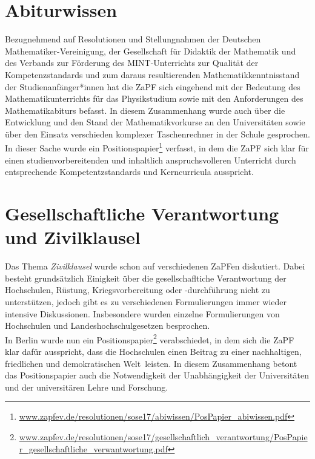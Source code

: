 \documentclass[a4paper]{article}
\begin{document}
\section*{Abiturwissen}
Bezugnehmend auf Resolutionen und Stellungnahmen der Deutschen
Mathematiker-Vereinigung, der Gesellschaft für Didaktik der Mathematik und des
Verbands zur Förderung des MINT-Unterrichts zur Qualität der Kompetenzstandards
und zum daraus resultierenden Mathematikkenntnisstand der Studienanfänger*innen
hat die ZaPF sich eingehend mit der Bedeutung des Mathematikunterrichts für das
Physikstudium sowie mit den Anforderungen des Mathematikabiturs befasst. In
diesem Zusammenhang wurde auch über die Entwicklung und den Stand der
Mathematikvorkurse an den Universitäten sowie über den Einsatz verschieden
komplexer Taschenrechner in der Schule gesprochen. In dieser Sache wurde ein
Positionspapier\footnote{\href{https://zapfev.de/resolutionen/sose17/abiwissen/PosPapier_abiwissen.pdf}{\url{www.zapfev.de/resolutionen/sose17/abiwissen/PosPapier_abiwissen.pdf}}}
verfasst, in dem die ZaPF sich klar für einen studienvorbereitenden und
inhaltlich anspruchsvolleren Unterricht durch entsprechende Kompetentzstandards
und Kerncurricula ausspricht.

\section*{Gesellschaftliche Verantwortung und Zivilklausel} 
Das Thema \emph{Zivilklausel} wurde schon auf verschiedenen ZaPFen diskutiert.
Dabei besteht grundsätzlich Einigkeit über die gesellschafltiche Verantwortung
der Hochschulen, Rüstung, Kriegsvorbereitung oder -durchführung nicht zu
unterstützen, jedoch gibt es zu verschiedenen Formulierungen immer wieder
intensive Diskussionen. Insbesondere wurden einzelne Formulierungen von
Hochschulen und Landeshochschulgesetzen besprochen.\\ In Berlin wurde nun ein
Positionspapier\footnote{\href{https://zapfev.de/resolutionen/sose17/gesellschaftlich_verantwortung/PosPapier_gesellschaftliche_verwantwortung.pdf}
{\url{www.zapfev.de/resolutionen/sose17/gesellschaftlich_verantwortung/PosPapier_gesellschaftliche_verwantwortung.pdf}}}
verabschiedet, in dem sich die ZaPF klar dafür ausspricht, \glqq dass die
Hochschulen einen Beitrag zu einer nachhaltigen, friedlichen und demokratischen
Welt\grqq~leisten. In diesem Zusammenhang betont das Positionspapier auch die
Notwendigkeit der Unabhängigkeit der Universitäten und der universitären Lehre
und Forschung.
\end{document}
